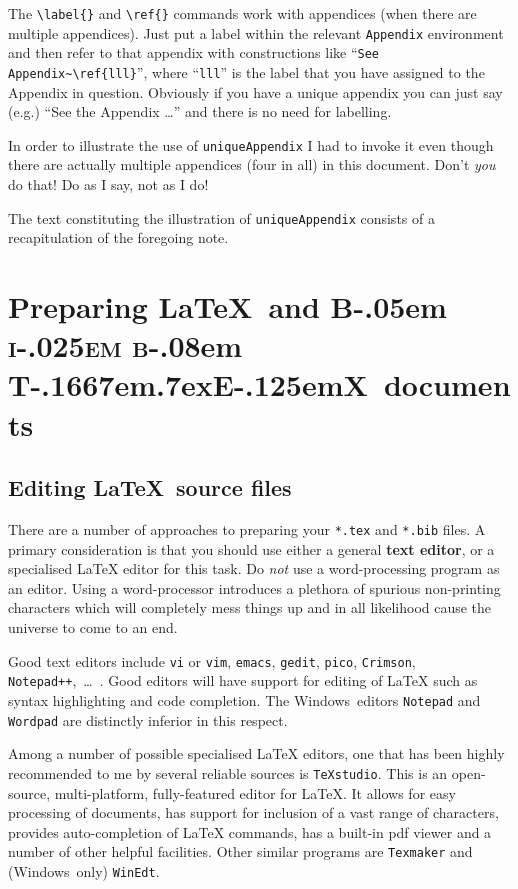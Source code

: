 \documentclass[times, doublespace]{anzsauth}
\newcommand\BibTeX{{\rmfamily B\kern-.05em \textsc{i\kern-.025em b}\kern-.08em
T\kern-.1667em\lower.7ex\hbox{E}\kern-.125emX}}
\begin{document}
The \verb!\label{}! and \verb!\ref{}! commands work with appendices
(when there are multiple appendices).  Just put a label within
the relevant \texttt{Appendix} environment and then refer to that
appendix with constructions like ``\verb!See Appendix~\ref{lll}!'',
where ``\verb!lll!'' is the label that you have assigned to the
Appendix in question.  Obviously if you have a unique appendix
you can just say (e.g.) ``See the Appendix \ldots'' and there
is no need for labelling.

In order to illustrate the use of \texttt{uniqueAppendix} I had to
invoke it even though there are actually multiple appendices (four
in all) in this document.  Don't \emph{you} do that!  Do as I say,
not as I do!

The text constituting the illustration of \texttt{uniqueAppendix}
consists of a recapitulation of the foregoing note.

\section{Preparing \LaTeX\ and \BibTeX\ documents}
\label{sec:prepDocs}

\subsection{Editing \LaTeX\ source files}
\label{sec:editors}

There are a number of approaches to preparing your \texttt{*.tex}
and \texttt{*.bib} files. A primary consideration is that you should
use either a general \textbf{text editor}, or a specialised \LaTeX{}
editor for this task.  Do \emph{not} use a word-processing program as
an editor. Using a word-processor introduces a plethora of spurious
non-printing characters which will completely mess things up and
in all likelihood cause the universe to come to an end.

Good text editors include \texttt{vi} or \texttt{vim},
\texttt{emacs}, \texttt{gedit}, \texttt{pico}, \texttt{Crimson},
\texttt{Notepad++},~\ldots\ .  Good editors will have support
for editing of \LaTeX{} such as syntax highlighting and code
completion. The Windows\texttrademark\ editors \texttt{Notepad}
and \texttt{Wordpad} are distinctly inferior in this respect.

Among a number of possible specialised \LaTeX{} editors, one that
has been highly recommended to me by several reliable sources
is \texttt{TeXstudio}. This is an open-source, multi-platform,
fully-featured editor for \LaTeX{}. It allows for easy processing of
documents, has support for inclusion of a vast range of characters,
provides auto-completion of \LaTeX{} commands, has a built-in pdf
viewer and a number of other helpful facilities. Other similar
programs are \texttt{Texmaker} and (Windows\texttrademark\ only)
\texttt{WinEdt}.
\end{document}
